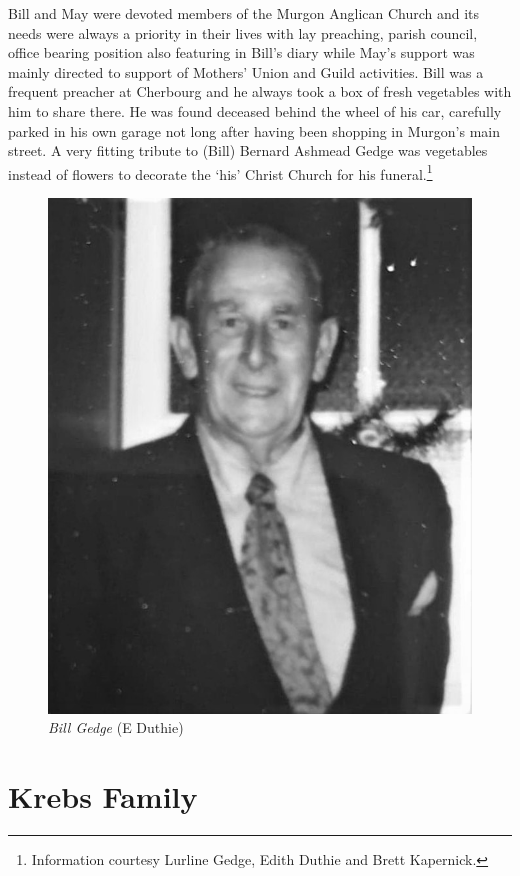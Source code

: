 Bill and May were devoted members of the Murgon Anglican Church and its needs were always a priority in their lives with lay preaching, parish council, office bearing position also featuring in Bill's diary while May's support was mainly directed to support of Mothers' Union and Guild activities. Bill was a frequent preacher at Cherbourg and he always took a box of fresh vegetables with him to share there. He was found deceased behind the wheel of his car, carefully parked in his own garage not long after having been shopping in Murgon's main street. A very fitting tribute to (Bill) Bernard Ashmead Gedge was vegetables instead of flowers to decorate the `his' Christ Church for his funeral.\footnote{Information courtesy Lurline Gedge, Edith Duthie and Brett Kapernick.}








\begin{figure}
\begin{center}
\includegraphics[width=.6\linewidth,center]{../images/BillGedge.jpg}
\caption{{\itshape Bill Gedge} {\scriptsize(E Duthie)}}
\end{center}
\end{figure}




\section{Krebs Family}



